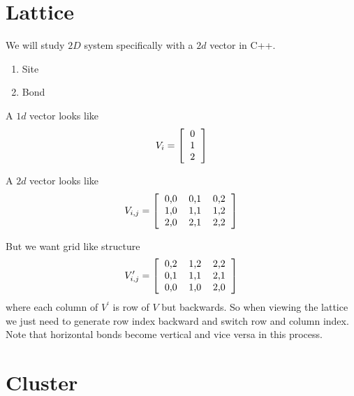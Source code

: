 \documentclass[10pt,a4paper]{report}
\begin{document}
	\section{Lattice}
	We will study $2D$ system specifically with a $2d$ vector in C++.
	\begin{enumerate}
		\item Site
		\item Bond
	\end{enumerate}
	
	A $1d$ vector looks like
	\begin{equation*}
	V_i = 
	\left[
	\begin{tabular}{c}
		0 \\ 1 \\ 2
	\end{tabular}
	\right]
	\end{equation*}
	
		A $2d$ vector looks like
	\begin{equation*}
	V_{i,j} = 
	\left[
	\begin{tabular}{cccc}
	0,0 & 0,1 & 0,2 \\
	1,0 & 1,1 & 1,2 \\
	2,0 & 2,1 & 2,2
	\end{tabular}
	\right]
	\end{equation*}
	
	But we want grid like structure 
	\begin{equation*}
	V^\prime_{i,j} = 
	\left[
	\begin{tabular}{cccc}
	0,2 & 1,2 & 2,2 \\
	0,1 & 1,1 & 2,1 \\
	0,0 & 1,0 & 2,0
	\end{tabular}
	\right]
	\end{equation*}
	where each column of $V^\prime$ is row of $V$ but backwards. So when viewing the lattice we just need to generate row index backward and  switch row and column index. Note that horizontal bonds become vertical and vice versa in this process.

	\section{Cluster}
\end{document}
